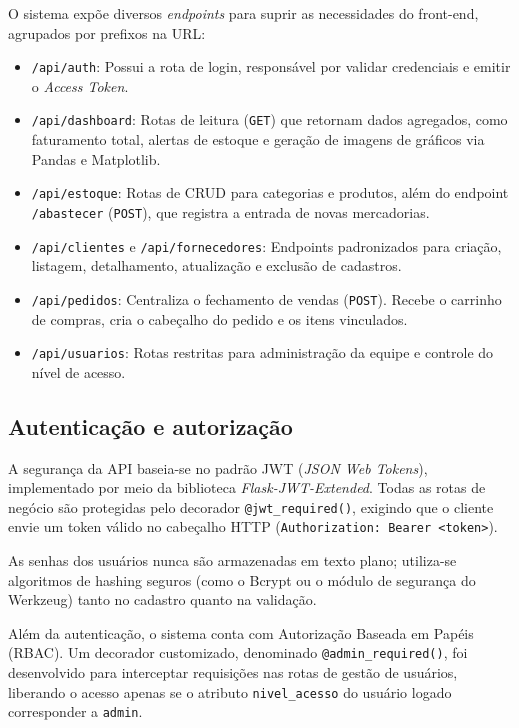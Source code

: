 O sistema expõe diversos \textit{endpoints} para suprir as necessidades do front-end, agrupados por prefixos na URL:

\begin{itemize}
    \item \texttt{/api/auth}: Possui a rota de login, responsável por validar credenciais e emitir o \textit{Access Token}.

    \item \texttt{/api/dashboard}: Rotas de leitura (\texttt{GET}) que retornam dados agregados, como faturamento total, alertas de estoque e geração de imagens de gráficos via Pandas e Matplotlib.

    \item \texttt{/api/estoque}: Rotas de CRUD para categorias e produtos, além do endpoint \texttt{/abastecer} (\texttt{POST}), que registra a entrada de novas mercadorias.

    \item \texttt{/api/clientes} e \texttt{/api/fornecedores}: Endpoints padronizados para criação, listagem, detalhamento, atualização e exclusão de cadastros.

    \item \texttt{/api/pedidos}: Centraliza o fechamento de vendas (\texttt{POST}). Recebe o carrinho de compras, cria o cabeçalho do pedido e os itens vinculados.

    \item \texttt{/api/usuarios}: Rotas restritas para administração da equipe e controle do nível de acesso.
\end{itemize}

\subsection{Autenticação e autorização}

A segurança da API baseia-se no padrão JWT (\textit{JSON Web Tokens}), implementado por meio da biblioteca \textit{Flask-JWT-Extended}. Todas as rotas de negócio são protegidas pelo decorador \texttt{@jwt\_required()}, exigindo que o cliente envie um token válido no cabeçalho HTTP (\texttt{Authorization: Bearer <token>}).

As senhas dos usuários nunca são armazenadas em texto plano; utiliza-se algoritmos de hashing seguros (como o Bcrypt ou o módulo de segurança do Werkzeug) tanto no cadastro quanto na validação.

Além da autenticação, o sistema conta com Autorização Baseada em Papéis (RBAC). Um decorador customizado, denominado \texttt{@admin\_required()}, foi desenvolvido para interceptar requisições nas rotas de gestão de usuários, liberando o acesso apenas se o atributo \texttt{nivel\_acesso} do usuário logado corresponder a \texttt{admin}.

